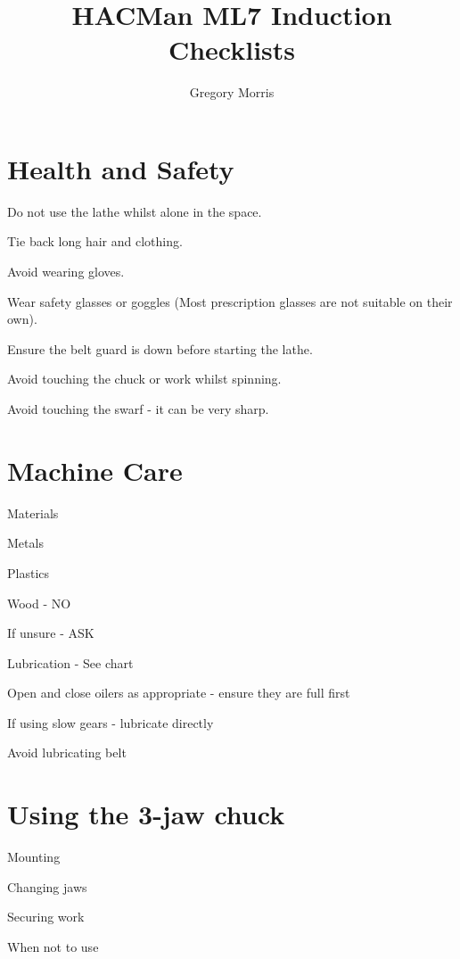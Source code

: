 \documentclass[11pt,a5paper,twoside,openany]{book}
\title{\textbf{HACMan ML7 Induction Checklists}}
\author{Gregory Morris}
\date{}
\newenvironment{checklist}{
  \begin{list}{}{}
  
}{%
  \end{list}
}
\begin{document}
\maketitle
\chapter{Health and Safety}
\begin{checklist}
\item Do not use the lathe whilst alone in the space.
\item Tie back long hair and clothing.
\item Avoid wearing gloves.
\item Wear safety glasses or goggles (Most prescription glasses are not suitable on their own).
\item Ensure the belt guard is down before starting the lathe.
\item Avoid touching the chuck or work whilst spinning.
\item Avoid touching the swarf - it can be very sharp.
\end{checklist}


\chapter{Machine Care}
\begin{checklist}
\item Materials
	\begin{checklist}
	\item Metals
	\item Plastics
	\item Wood - NO
	\item If unsure - ASK
	\end{checklist}
\item Lubrication - See chart
\item Open and close oilers as appropriate - ensure they are full first
\item If using slow gears - lubricate directly
\item Avoid lubricating belt
\end{checklist}



\chapter{Using the 3-jaw chuck}
	\begin{checklist}
	\item Mounting
	\item Changing jaws
	\item Securing work
	\item When not to use
	\end{checklist}
\end{document}
